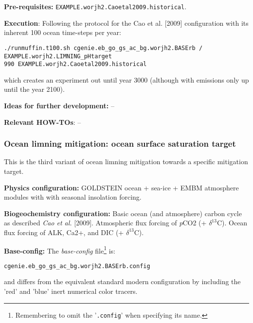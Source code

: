 \documentclass[10pt,twoside]{article}
\begin{document}
\noindent \textbf{Pre-requisites:} \texttt{EXAMPLE.worjh2.Caoetal2009.historical}.

\noindent \textbf{Execution}: Following the protocol for the Cao et al. [2009] configuration with its inherent 100 ocean time-steps per year:
\vspace{-10pt}\small\begin{verbatim}./runmuffin.t100.sh cgenie.eb_go_gs_ac_bg.worjh2.BASErb / EXAMPLE.worjh2.LIMNING_pHtarget 
990 EXAMPLE.worjh2.Caoetal2009.historical\end{verbatim}\normalsize\vspace{-10pt}
which creates an experiment out until year 3000 (although with emissions only up until the year 2100).

\noindent \textbf{Ideas for further development:} --

\noindent \textbf{Relevant HOW-TOs}: --


\subsubsection{Ocean limning mitigation: ocean surface saturation target}\label{EXAMPLE.worjh2.LIMNING.sattarget}

This is the third variant of ocean limning mitigation towards a specific mitigation target.

\noindent \textbf{Physics configuration:} GOLDSTEIN ocean + sea-ice + EMBM atmosphere modules with with seasonal insolation forcing.

\noindent \textbf{Biogeochemistry configuration:} Basic ocean (and atmosphere) carbon cycle as described \textit{Cao et al.} [2009]. Atmospheric flux forcing of \textit{p}CO2 (+ $\delta^{13}$C). Ocean flux forcing of ALK, Ca2+, and  DIC (+ $\delta^{13}$C).

\noindent \textbf{Base-config:} The \textit{base-config} file\footnote{Remembering to omit the '\texttt{.config}' when specifying its name.} is:
\vspace{-10pt}\begin{verbatim}cgenie.eb_go_gs_ac_bg.worjh2.BASErb.config\end{verbatim}\vspace{-10pt}
and differs from the equivalent standard modern configuration by including the 'red' and 'blue' inert numerical color tracers.
\end{document}
